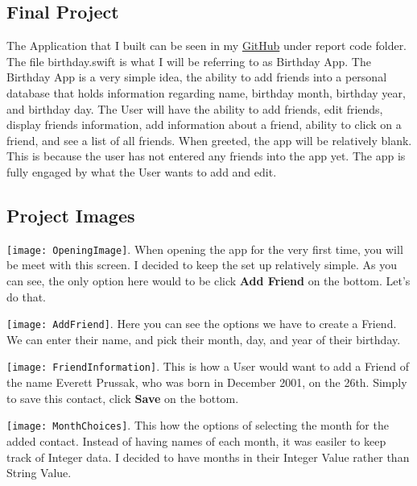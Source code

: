\documentclass{article}
\theoremstyle{theorem}
\theoremstyle{definition}
\theoremstyle{remark}
\begin{document}
\subsection{Final Project}
The Application that I built can be seen in my \href{https://github.com/everettprussak/CPSC354}{GitHub} under report code folder. The file birthday.swift is what I will be referring to as Birthday App. The Birthday App is a very simple idea, the ability to add friends into a personal database that holds information regarding name, birthday month, birthday year, and birthday day. The User will have the ability to add friends, edit friends, display friends information, add information about a friend, ability to click on a friend, and see a list of all friends. When greeted, the app will be relatively blank. This is because the user has not entered any friends into the app yet. The app is fully engaged by what the User wants to add and edit. 

\subsection{Project Images}
\texttt{[image: OpeningImage]}\noindent{}. When opening the app for the very first time, you will be meet with this screen. I decided to keep the set up relatively simple. As you can see, the only option here would to be click \textbf{Add Friend} on the bottom. Let's do that.\newline\newline

\texttt{[image: AddFriend]}\noindent{}. Here you can see the options we have to create a Friend. We can enter their name, and pick their month, day, and year of their birthday. \newline\newline

\texttt{[image: FriendInformation]}\noindent{}. This is how a User would want to add a Friend of the name Everett Prussak, who was born in December 2001, on the 26th. Simply to save this contact, click \textbf{Save} on the bottom. \newline\newline

\texttt{[image: MonthChoices]}\noindent{}. This how the options of selecting the month for the added contact. Instead of having names of each month, it was easiler to keep track of Integer data. I decided to have months in their Integer Value rather than String Value. \newline\newline
\end{document}
